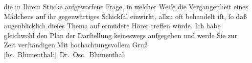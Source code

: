 \begin{ledgroupsized}[t]{13cm}
               die in Ihrem Stücke aufgeworfene
               Frage, in welcher Weiſe die Vergangenheit eines Mädchens auf ihr gegenwärtiges
               Schickſal einwirkt, allzu oft behandelt iſt, ſo daß augenblicklich dieſes Thema auf
               ermüdete Hörer treffen würde. Ich habe gleichwohl den Plan der Darſtellung keineswegs
               aufgegeben und werde Sie zur Zeit verſtändigen.\hspace*{2.5em}Mit
               hochachtungsvollem Gruß\pend
           \pstart \spacefill\mbox{{[}hs. Blumenthal:{]} Dr. Osc. Blumenthal}\pend{}
         
         \endnumbering{}\end{ledgroupsized}  \newcommand{\dateiname}{L00253}\newcommand{\titel}{Oscar Blumenthal an Arthur Schnitzler, 12. 8. 1893}\newcommand{\editorInnen}{Martin Anton Müller und Gerd-Hermann Susen}
      